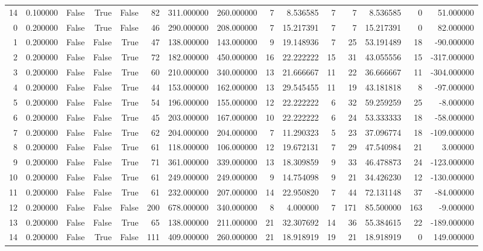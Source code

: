 \begin{table}[htbp]
\begin{tabular}{rrrrrrrrrrrrrrr}
14 & 0.100000 & False & True & False & 82 & 311.000000 & 260.000000 & 7 & 8.536585 & 7 & 7 & 8.536585 & 0 & 51.000000 \\
0 & 0.200000 & False & True & False & 46 & 290.000000 & 208.000000 & 7 & 15.217391 & 7 & 7 & 15.217391 & 0 & 82.000000 \\
1 & 0.200000 & False & False & True & 47 & 138.000000 & 143.000000 & 9 & 19.148936 & 7 & 25 & 53.191489 & 18 & -90.000000 \\
2 & 0.200000 & False & False & True & 72 & 182.000000 & 450.000000 & 16 & 22.222222 & 15 & 31 & 43.055556 & 15 & -317.000000 \\
3 & 0.200000 & False & False & True & 60 & 210.000000 & 340.000000 & 13 & 21.666667 & 11 & 22 & 36.666667 & 11 & -304.000000 \\
4 & 0.200000 & False & False & True & 44 & 153.000000 & 162.000000 & 13 & 29.545455 & 11 & 19 & 43.181818 & 8 & -97.000000 \\
5 & 0.200000 & False & False & True & 54 & 196.000000 & 155.000000 & 12 & 22.222222 & 6 & 32 & 59.259259 & 25 & -8.000000 \\
6 & 0.200000 & False & False & True & 45 & 203.000000 & 167.000000 & 10 & 22.222222 & 6 & 24 & 53.333333 & 18 & -58.000000 \\
7 & 0.200000 & False & False & True & 62 & 204.000000 & 204.000000 & 7 & 11.290323 & 5 & 23 & 37.096774 & 18 & -109.000000 \\
8 & 0.200000 & False & False & True & 61 & 118.000000 & 106.000000 & 12 & 19.672131 & 7 & 29 & 47.540984 & 21 & 3.000000 \\
9 & 0.200000 & False & False & True & 71 & 361.000000 & 339.000000 & 13 & 18.309859 & 9 & 33 & 46.478873 & 24 & -123.000000 \\
10 & 0.200000 & False & False & True & 61 & 249.000000 & 249.000000 & 9 & 14.754098 & 9 & 21 & 34.426230 & 12 & -130.000000 \\
11 & 0.200000 & False & False & True & 61 & 232.000000 & 207.000000 & 14 & 22.950820 & 7 & 44 & 72.131148 & 37 & -84.000000 \\
12 & 0.200000 & False & False & False & 200 & 678.000000 & 340.000000 & 8 & 4.000000 & 7 & 171 & 85.500000 & 163 & -9.000000 \\
13 & 0.200000 & False & False & True & 65 & 138.000000 & 211.000000 & 21 & 32.307692 & 14 & 36 & 55.384615 & 22 & -189.000000 \\
14 & 0.200000 & False & True & False & 111 & 409.000000 & 260.000000 & 21 & 18.918919 & 19 & 21 & 18.918919 & 0 & 149.000000 \\

\end{tabular}
\end{table}
